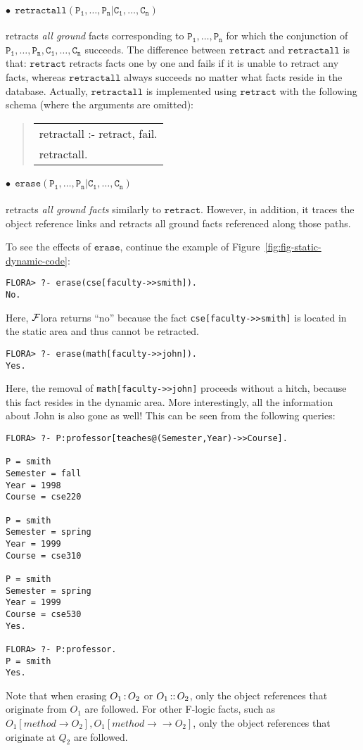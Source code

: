 \documentclass[11pt]{article}
\newenvironment{qrules}{\begin{quote}\sf\begin{tabular}[t]{l}}%
{\end{tabular}\end{quote}}
\newcommand{\isa}{\,{\bf{:}}\,}
\newcommand{\subcl}{\,{\bf{::}}\,}
\newcommand{\fd}{\ensuremath{{\rightarrow}}}                   %
\newcommand{\mvd}{\ensuremath{{\rightarrow\!\!\!\!\rightarrow}}}  %
\newcommand{\FLORA}{{\mbox{${\cal F}${\sc lora}}}\xspace}
\newcommand{\fl}{{F-logic}\xspace}
\begin{document}
\paragraph{$\bullet~~\mathtt{retractall(P_1,\ldots,P_n | C_1,\ldots,C_n)}$} retracts \emph{all ground}
facts corresponding to $\mathtt{P_1,\ldots,P_n}$ for which the conjunction
of $\mathtt{P_1,\ldots,P_n,C_1,\ldots,C_n}$ succeeds. The difference
between $\mathtt{retract}$ and $\mathtt{retractall}$ is that:
$\mathtt{retract}$ retracts facts one by one and fails if it is unable to
retract any facts, whereas $\mathtt{retractall}$ always succeeds no matter
what facts reside in the database. Actually, $\mathtt{retractall}$ is
implemented using $\mathtt{retract}$ with the following schema (where the
arguments are omitted):
\begin{qrules}
retractall :- retract, fail. \\
retractall.
\end{qrules}

\paragraph{$\bullet~~\mathtt{erase(P_1,\ldots,P_n | C_1,\ldots,C_n)}$}
retracts \emph{all ground facts} 
similarly to $\mathtt{retract}$. However, in addition, it traces the object
reference links and retracts all ground facts referenced along those paths.

To see the effects of $\mathtt{erase}$, continue
the example of Figure~\ref{fig:fig-static-dynamic-code}:
\begin{verbatim}
FLORA> ?- erase(cse[faculty->>smith]).
No.
\end{verbatim}
Here, \FLORA returns ``no'' because the fact {\tt cse[faculty->>smith]} is
located in the static area and thus cannot be retracted.

\begin{verbatim}
FLORA> ?- erase(math[faculty->>john]).
Yes.
\end{verbatim}
Here, the removal of {\tt math[faculty->>john]} proceeds without a hitch,
because this fact resides in the dynamic area. More interestingly, all the
information about John is also gone as well!
This can be seen from the following queries:
\begin{verbatim}
FLORA> ?- P:professor[teaches@(Semester,Year)->>Course].

P = smith
Semester = fall
Year = 1998
Course = cse220

P = smith
Semester = spring
Year = 1999
Course = cse310

P = smith
Semester = spring
Year = 1999
Course = cse530
Yes.

FLORA> ?- P:professor.
P = smith
Yes.
\end{verbatim}
Note that when erasing $O_1{\isa}O_2$ or $O_1{\subcl}O_2$, only the object
references that originate from $O_1$ are followed. For other \fl facts, such as
$O_1[method{\fd}O_2],O_1[method{\mvd}O_2]$, only the object references
that originate at $Q_2$ are followed.
\end{document}
